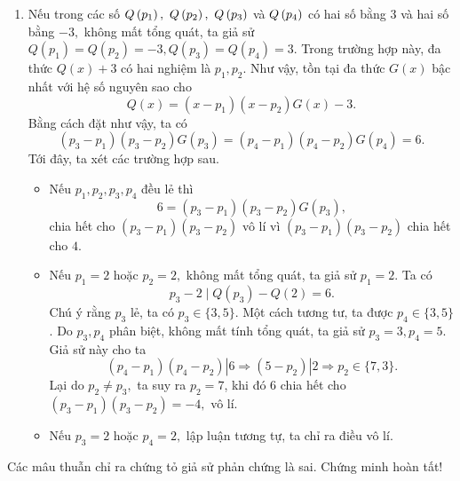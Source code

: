 \begin{gbtt}
{\begin{enumerate}
\begin{itemize}
        \begin{align*}
        \left|a\left(p_{4}-p_{1}\right)\left(p_{4}-p_{2}\right)\left(p_{4}-p_{3}\right)\right|
        &=\left|a\right||\left(p_{4}-p_{1}\right)\left(p_{4}-p_{2}\right)\left(p_{4}-p_{3}\right)|       
        \\&=\left|a\right|\left(p_{1}-2\right)\left(p_{2}-2\right)\left(p_{3}-2\right) \\&\geq|a|(3-2)(5-2)(7-2)
        \\&\ge 15|a|\\&\ge 15\\&>6, \text{ mâu thuẫn với (*).}
        \end{align*}
    \end{itemize}
    \item Nếu trong các số $Q\tron{p_1},\ Q\tron{p_2},\ Q\tron{p_3}$ và $Q\left(\displaystyle p_4 \right)$ có hai số bằng $3$ và hai số bằng $-3,$ không mất tổng quát, ta giả sử $Q\left(p_{1}\right)=Q\left(p_{2}\right)=-3, Q\left(p_{3}\right)=Q\left(p_{4}\right)=3.$ Trong trường hợp này, đa thức $Q(x)+3$ có hai nghiệm là $p_1,p_2.$ Như vậy, tồn tại đa thức $G(x)$ bậc nhất với hệ số nguyên sao cho $$Q(x)=\left(x-p_{1}\right)\left(x-p_{2}\right)G(x)-3.$$
    Bằng cách đặt như vậy, ta có
    $$\left(p_{3}-p_{1}\right)\left(p_{3}-p_{2}\right) G\left(p_{3}\right)=\left(p_{4}-p_{1}\right)\left(p_{4}-p_{2}\right) G\left(p_{4}\right)=6.$$
     Tới đây, ta xét các trường hợp sau.    
    \begin{itemize}
        \item{} Nếu $p_1,p_2,p_3,p_4$ đều lẻ thì 
        $$6=\left(p_{3}-p_{1}\right)\left(p_{3}-p_{2}\right) G\left(p_{3}\right),$$ 
        chia hết cho $\left(p_{3}-p_{1}\right)\left(p_{3}-p_{2}\right)$ vô lí vì $\left(p_{3}-p_{1}\right)\left(p_{3}-p_{2}\right)$ chia hết cho $4.$
        \item{} Nếu $p_1=2$ hoặc $p_2=2,$ không mất tổng quát, ta giả sử $p_1=2.$ Ta có
        $$p_{3}-2 \mid Q\left(p_{3}\right)-Q(2)= 6.$$
        Chú ý rằng $p_3$ lẻ, ta có $p_{3} \in\{3,5\}.$ Một cách tương tư, ta được $p_{4} \in\{3,5\}$. Do $p_{3}, p_{4}$ phân biệt, không mất tính tổng quát, ta giả sử $p_{3}=3, p_{4}=5.$ Giả sử này cho ta
        $$\left(p_{4}-p_{1}\right)\left(p_{4}-p_{2}\right)\left|6 \Rightarrow\left(5-p_{2}\right)\right| 2 \Rightarrow p_{2} \in\{7,3\}.$$
        Lại do $p_2\ne p_3,$ ta suy ra $p_2=7$, khi đó
        $6$ chia hết cho $\left(p_{3}-p_{1}\right)\left(p_{3}-p_{2}\right)=-4,$ vô lí.
        \item{} Nếu $p_3=2$ hoặc $p_4=2,$ lập luận tương tự, ta chỉ ra điều vô lí. 
    \end{itemize}
\end{enumerate}
Các mâu thuẫn chỉ ra chứng tỏ giả sử phản chứng là sai. Chứng minh hoàn tất!}
\end{gbtt}    

